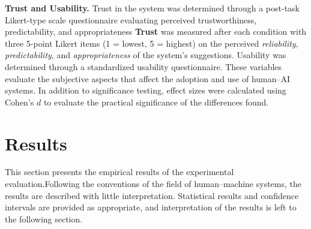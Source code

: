 \documentclass[journal]{IEEEtran}
\theoremstyle{plain}
\theoremstyle{definition}
\providecommand{\DIFaddtex}[1]{{\protect\color{blue} \sf #1}} %
\providecommand{\DIFdeltex}[1]{{\protect\color{red} \scriptsize #1}} %
\providecommand{\DIFaddbegin}{} %
\providecommand{\DIFaddend}{} %
\providecommand{\DIFdelbegin}{} %
\providecommand{\DIFdelend}{} %
\providecommand{\DIFadd}[1]{\texorpdfstring{\DIFaddtex{#1}}{#1}} %
\providecommand{\DIFdel}[1]{\texorpdfstring{\DIFdeltex{#1}}{}} %
\newcommand{\DIFscaledelfig}{0.5}
\newlength{\DIFdelgraphicswidth} %
\newlength{\DIFdelgraphicsheight} %
\newcommand{\DIFaddincludegraphics}[2][]{{\color{blue}\fbox{\DIFOincludegraphics[#1]{#2}}}} %
\newcommand{\DIFdelincludegraphics}[2][]{%
\sbox{\DIFdelgraphicsbox}{\DIFOincludegraphics[#1]{#2}}%
\settoboxwidth{\DIFdelgraphicswidth}{\DIFdelgraphicsbox} %
\settoboxtotalheight{\DIFdelgraphicsheight}{\DIFdelgraphicsbox} %
\scalebox{\DIFscaledelfig}{%
\parbox[b]{\DIFdelgraphicswidth}{\usebox{\DIFdelgraphicsbox}\\[-\baselineskip] \rule{\DIFdelgraphicswidth}{0em}}\llap{\resizebox{\DIFdelgraphicswidth}{\DIFdelgraphicsheight}{%
\setlength{\unitlength}{\DIFdelgraphicswidth}%
\begin{picture}(1,1)%
\thicklines\linethickness{2pt} %
{\color[rgb]{1,0,0}\put(0,0){\framebox(1,1){}}}%
{\color[rgb]{1,0,0}\put(0,0){\line( 1,1){1}}}%
{\color[rgb]{1,0,0}\put(0,1){\line(1,-1){1}}}%
\end{picture}%
}\hspace*{3pt}}} %
} %
\DeclareRobustCommand{\DIFaddbegin}{\DIFOaddbegin \let\includegraphics\DIFaddincludegraphics} %
\DeclareRobustCommand{\DIFaddend}{\DIFOaddend \let\includegraphics\DIFOincludegraphics} %
\DeclareRobustCommand{\DIFdelbegin}{\DIFOdelbegin \let\includegraphics\DIFdelincludegraphics} %
\DeclareRobustCommand{\DIFdelend}{\DIFOaddend \let\includegraphics\DIFOincludegraphics} %
\begin{document}
    \DIFdelbegin \DIFdel{\textbf{Trust and Usability.}
    Trust in the system was determined through a post-task Likert-type scale questionnaire evaluating perceived trustworthiness, predictability, and appropriateness }\DIFdelend \DIFaddbegin \DIFadd{\textbf{Trust} was measured after each condition with three 5-point Likert items (1 = lowest, 5 = highest) on the perceived \emph{reliability}, \emph{predictability}, and \emph{appropriateness} }\DIFaddend of the system's \DIFdelbegin \DIFdel{suggestions. Usability was determined through a standardized usability questionnaire. These variables evaluate the subjective aspects that affect the adoption and use of human--AI systems.
    In addition to significance testing, effect sizes were calculated using Cohen's $d$ to evaluate the practical significance of the differences found. }%

    \section{\DIFdel{Results}}
\addtocounter{section}{-1}%
\DIFdel{This section presents the empirical results of the experimental evaluation.Following the conventions of the field of human--machine systems, the results are described with little interpretation. Statistical results and confidence intervals are provided as appropriate, and interpretation of the results is left to the following section. }%

\end{document}
